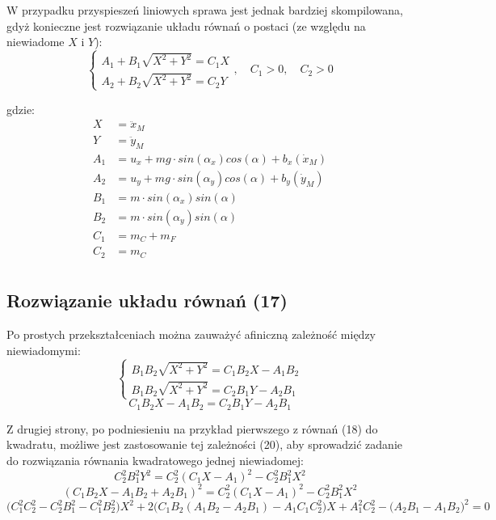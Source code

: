 \documentclass[10pt]{article}
\begin{document}
W przypadku przyspieszeń liniowych sprawa jest jednak bardziej skompilowana, gdyż konieczne jest rozwiązanie układu równań o postaci (ze względu na niewiadome $X$ i $Y$):
\begin{equation}
\begin{cases}
A_1+B_1\sqrt{X^2 + Y^2} = C_1X \\ 
A_2+B_2\sqrt{X^2 + Y^2} = C_2Y
\end{cases}, \quad C_1 > 0, \quad C_2 > 0
\end{equation}

gdzie:
\begin{equation*}
\begin{split}
X &= \ddot{x}_M \\
Y &= \ddot{y}_M \\
A_1 &= u_x + mg \cdot sin(\alpha_x)cos(\alpha) + b_x(\dot{x}_M) \\
A_2 &= u_y + mg \cdot sin(\alpha_y)cos(\alpha) + b_y(\dot{y}_M) \\
B_1 &= m \cdot sin(\alpha_x) sin(\alpha) \\
B_2 &= m \cdot sin(\alpha_y) sin(\alpha) \\
C_1 &= m_C + m_F \\
C_2 &= m_C \\
\end{split}
\end{equation*}

\subsection*{Rozwiązanie układu równań (17)}
Po prostych przekształceniach można zauważyć afiniczną zależność między niewiadomymi:
\begin{equation}
\begin{cases}
B_1 B_2 \sqrt{X^2 + Y^2} = C_1 B_2 X - A_1 B_2 \\ 
B_1 B_2 \sqrt{X^2 + Y^2} = C_2 B_1 Y - A_2 B_1
\end{cases}
\end{equation}
\begin{equation}
C_1 B_2 X - A_1 B_2 = C_2 B_1 Y - A_2 B_1
\end{equation}

Z drugiej strony, po podniesieniu na przykład pierwszego z równań (18) do kwadratu, możliwe jest zastosowanie tej zależności (20), aby sprowadzić zadanie do rozwiązania równania kwadratowego jednej niewiadomej:
\begin{equation}
C_2^2 B_1^2 Y^2 = C_2^2 (C_1 X - A_1)^2 - C_2^2 B_1^2 X^2
\end{equation}
\begin{equation}
(C_1 B_2 X - A_1 B_2 + A_2 B_1)^2 = C_2^2 (C_1 X - A_1)^2 - C_2^2 B_1^2 X^2
\end{equation}
\begin{equation}
\big(C_1^2 C_2^2 - C_2^2 B_1^2 - C_1^2 B_2^2 \big) X^2 + 
2\big(C_1B_2 (A_1B_2 - A_2B_1) - A_1C_1C_2^2 \big) X +
A_1^2 C_2^2 - \big(A_2B_1 - A_1B_2 \big)^2
 = 0
\end{equation}
\end{document}
